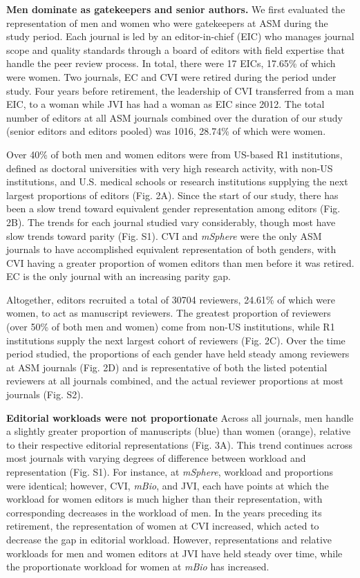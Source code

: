 \documentclass[11pt,]{article}
\begin{document}
\textbf{Men dominate as gatekeepers and senior authors.} We first
evaluated the representation of men and women who were gatekeepers at
ASM during the study period. Each journal is led by an editor-in-chief
(EIC) who manages journal scope and quality standards through a board of
editors with field expertise that handle the peer review process. In
total, there were 17 EICs, 17.65\% of which were women. Two journals, EC
and CVI were retired during the period under study. Four years before
retirement, the leadership of CVI transferred from a man EIC, to a woman
while JVI has had a woman as EIC since 2012. The total number of editors
at all ASM journals combined over the duration of our study (senior
editors and editors pooled) was 1016, 28.74\% of which were women.

Over 40\% of both men and women editors were from US-based R1
institutions, defined as doctoral universities with very high research
activity, with non-US institutions, and U.S. medical schools or research
institutions supplying the next largest proportions of editors (Fig.
2A). Since the start of our study, there has been a slow trend toward
equivalent gender representation among editors (Fig. 2B). The trends for
each journal studied vary considerably, though most have slow trends
toward parity (Fig. S1). CVI and \emph{mSphere} were the only ASM
journals to have accomplished equivalent representation of both genders,
with CVI having a greater proportion of women editors than men before it
was retired. EC is the only journal with an increasing parity gap.

Altogether, editors recruited a total of 30704 reviewers, 24.61\% of
which were women, to act as manuscript reviewers. The greatest
proportion of reviewers (over 50\% of both men and women) come from
non-US institutions, while R1 institutions supply the next largest
cohort of reviewers (Fig. 2C). Over the time period studied, the
proportions of each gender have held steady among reviewers at ASM
journals (Fig. 2D) and is representative of both the listed potential
reviewers at all journals combined, and the actual reviewer proportions
at most journals (Fig. S2).

\textbf{Editorial workloads were not proportionate} Across all journals,
men handle a slightly greater proportion of manuscripts (blue) than
women (orange), relative to their respective editorial representations
(Fig. 3A). This trend continues across most journals with varying
degrees of difference between workload and representation (Fig. S1). For
instance, at \emph{mSphere}, workload and proportions were identical;
however, CVI, \emph{mBio}, and JVI, each have points at which the
workload for women editors is much higher than their representation,
with corresponding decreases in the workload of men. In the years
preceding its retirement, the representation of women at CVI increased,
which acted to decrease the gap in editorial workload. However,
representations and relative workloads for men and women editors at JVI
have held steady over time, while the proportionate workload for women
at \emph{mBio} has increased.
\end{document}
